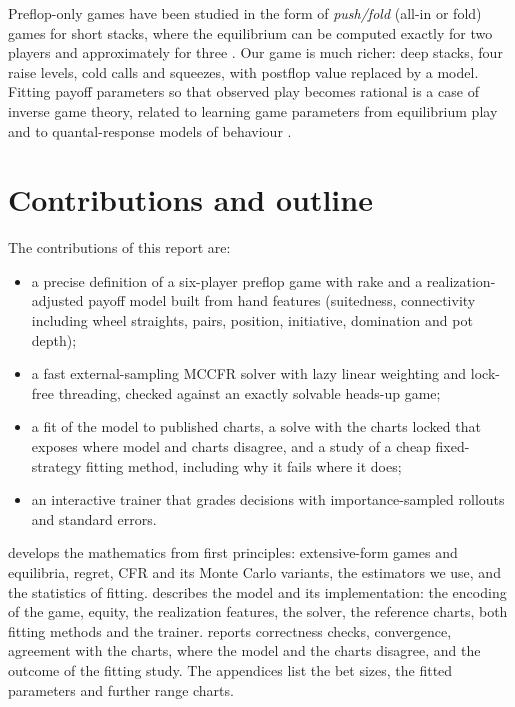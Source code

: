 Preflop-only games have been studied in the form of \emph{push/fold} (all-in or fold) games for short stacks, where the equilibrium can be computed exactly for two players and approximately for three \cite{ganzfried2008}. Our game is much richer: deep stacks, four raise levels, cold calls and squeezes, with postflop value replaced by a model. Fitting payoff parameters so that observed play becomes rational is a case of inverse game theory, related to learning game parameters from equilibrium play \cite{ling2018} and to quantal-response models of behaviour \cite{mckelvey1995}.

\section{Contributions and outline}\label{sec:intro-outline}

The contributions of this report are:
\begin{itemize}
  \item a precise definition of a six-player preflop game with rake and a realization-adjusted payoff model built from hand features (suitedness, connectivity including wheel straights, pairs, position, initiative, domination and pot depth);
  \item a fast external-sampling MCCFR solver with lazy linear weighting and lock-free threading, checked against an exactly solvable heads-up game;
  \item a fit of the model to published charts, a solve with the charts locked that exposes where model and charts disagree, and a study of a cheap fixed-strategy fitting method, including why it fails where it does;
  \item an interactive trainer that grades decisions with importance-sampled rollouts and standard errors.
\end{itemize}

 develops the mathematics from first principles: extensive-form games and equilibria, regret, CFR and its Monte Carlo variants, the estimators we use, and the statistics of fitting.  describes the model and its implementation: the encoding of the game, equity, the realization features, the solver, the reference charts, both fitting methods and the trainer.  reports correctness checks, convergence, agreement with the charts, where the model and the charts disagree, and the outcome of the fitting study. The appendices list the bet sizes, the fitted parameters and further range charts.
